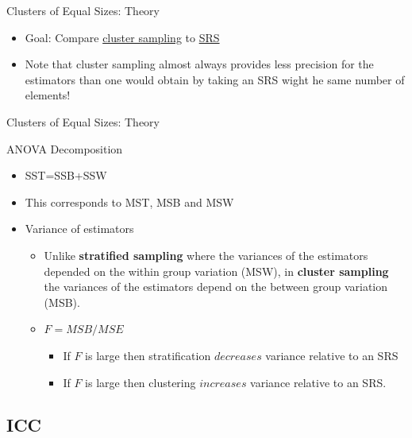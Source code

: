 \documentclass[10pt]{beamer}\usepackage[]{graphicx}\usepackage[]{xcolor}
\begin{document}
\begin{frame}{Clusters of Equal Sizes: Theory}
\begin{block}{}
\begin{itemize}
\item Goal: Compare \underline{cluster sampling} to \underline{SRS}
\item Note that cluster sampling almost always provides less precision for the estimators than one would obtain by taking an SRS wight he same number of elements!
\end{itemize}
\end{block}
\end{frame}


\begin{frame}{Clusters of Equal Sizes: Theory}
\begin{block}{ANOVA Decomposition}
\begin{itemize}
\item SST=SSB+SSW
\item This corresponds to MST, MSB and MSW
\item Variance of estimators
\begin{itemize}
\item Unlike  \textbf{stratified sampling} where the variances of the estimators depended on the within group variation (MSW), in \textbf{cluster sampling} the variances of the estimators depend on the between group variation (MSB).
\item $F=MSB/MSE$
\begin{itemize}
\item If $F$ is large then stratification $decreases$ variance relative to an SRS
\item If $F$ is large then clustering $increases$ variance relative to an SRS.
\end{itemize}
\end{itemize}
\end{itemize}
\end{block}
\end{frame}

\subsection{ICC}
\end{document}
